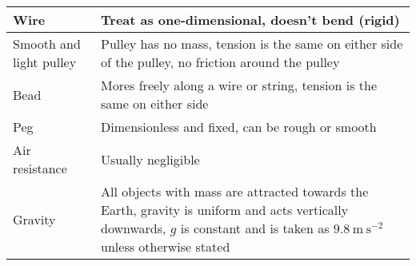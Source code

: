 \begin{tabular}{|m{3.9cm} | m{13.5cm}|}
    \hline
    Wire                      & Treat as one-dimensional, doesn't bend (rigid)                                                                                                                                                          \\
    \hline
    Smooth and light pulley   & Pulley has no mass, tension is the same on either side of the pulley, no friction around the pulley                                                                                                     \\
    \hline
    Bead                      & Mores freely along a wire or string, tension is the same on either side                                                                                                                                 \\
    \hline
    Peg                       & Dimensionless and fixed, can be rough or smooth                                                                                                                                                         \\
    \hline
    Air resistance            & Usually negligible                                                                                                                                                                                      \\
    \hline
    Gravity                   & All objects with mass are attracted towards the Earth, gravity is uniform and acts vertically downwards, $g$ is constant and is taken as $9.8 \: \mathrm{m} \: \mathrm{s}^{-2}$ unless otherwise stated \\
    \hline
\end{tabular}